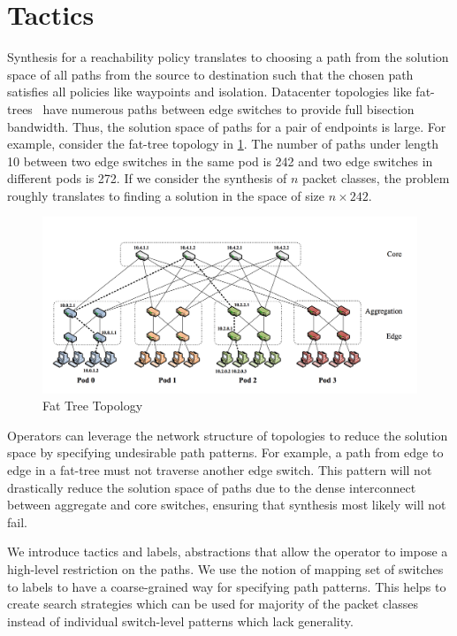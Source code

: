 \section{Tactics} \label{sec:tactic}
Synthesis for a reachability policy translates to choosing a path from the 
solution space of all paths from the source to destination such that the 
chosen path satisfies all policies like waypoints and isolation. Datacenter 
topologies like fat-trees~\cite{fattree} have numerous paths between 
edge switches to provide full bisection bandwidth. 
Thus, the solution space of paths for a pair of endpoints is large. 
For example, consider the fat-tree topology in \cref{fig:fattree}. 
The number of paths under length 10 between two edge  switches 
in the same pod is 242 and two edge switches in different pods is 272. 
If we consider the synthesis of $n$ packet classes, the problem 
roughly translates to finding a solution in the space of size $n \times 242$.
\begin{figure}[h]
	\includegraphics[width=\columnwidth]{fattree.png}
	\caption{Fat Tree Topology}
	\label{fig:fattree}
\end{figure}
Operators can leverage the network structure of topologies
 to reduce the solution space by specifying undesirable path patterns. 
 For example, a path from edge to edge in a fat-tree must not traverse another edge switch.
 This pattern will not drastically reduce the solution space of paths 
 due to the dense interconnect between aggregate and core switches,
 ensuring that synthesis most likely will not fail. 

We introduce tactics and labels, abstractions that allow the 
operator to impose a high-level restriction on the paths. 
We use the notion of mapping set of switches to labels to 
have a coarse-grained way for specifying path patterns. This helps
to create search strategies which can be used for majority 
of the packet classes instead of individual switch-level patterns which
lack generality.

